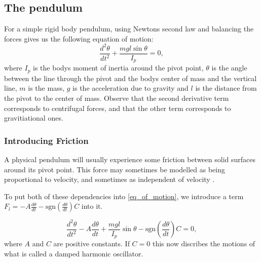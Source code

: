 ﻿\documentclass[11pt, a4paper]{article}
\begin{document}
\subsection{The pendulum}
For a simple rigid body pendulum, using Newtons second law and balancing the
forces gives us the following
equation of motion:
\begin{equation}
  \frac{d^2\theta}{dt^2} + \frac{mgl\sin{\theta}}{I_p} = 0,
  \label{eq_of_motion}
\end{equation}
where $I_p$ is the bodys moment of inertia around the pivot point, $\theta$ is the
angle between the line through the pivot and the bodys center of mass and the
vertical line, $m$ is the mass, $g$ is the acceleration due to gravity and
$l$ is the distance from the pivot to the center of mass. 
Observe that the second derivative term corresponds to centrifugal forces, and
that the other term corresponds to gravitiational ones.




\subsubsection{Introducing Friction}
A physical pendulum will usually experience some friction between solid
surfaces around its pivot point.
This force may sometimes be modelled as being proportional to velocity\cite[p. 30]{book},
and sometimes as independent of velocity \cite{friction}.


To put both of these dependencies into \ref{eq_of_motion}, 
we introduce a term $F_l = -A \frac{d\theta}{dt} - \text{sgn}\left(\frac{d\theta}{dt}\right)C$ into it. 

\begin{equation}
    \frac{d^2\theta}{dt^2} 
  - A \frac{d\theta}{dt}
  + \frac{mgl}{I_p}\sin{\theta} 
  - \text{sgn}(\frac{d\theta}{dt})C 
  = 0,
  \label{eq_of_motion_comp1}
\end{equation}
where $A$ and $C$ are positive constants.
If $C = 0$ this now discribes the motions of what is 
called a damped harmonic oscillator\cite{osc}.
\end{document}
